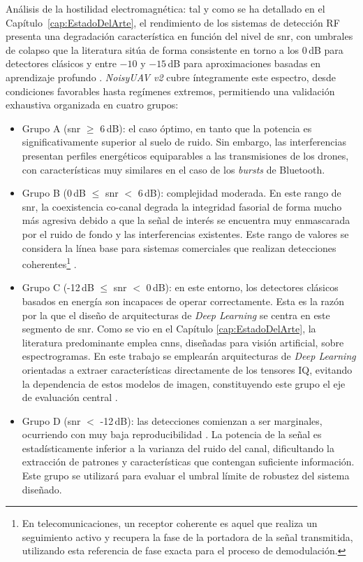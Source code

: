 Análisis de la hostilidad electromagnética: tal y como se ha detallado en el Capítulo~\ref{cap:EstadoDelArte}, el rendimiento de los sistemas de detección RF presenta una degradación característica en función del nivel de \gls{snr}, con umbrales de colapso que la literatura sitúa de forma consistente en torno a los $0$\,dB para detectores clásicos y entre $-10$ y $-15$\,dB para aproximaciones basadas en aprendizaje profundo \cite{zheng_uavsignal_2025, gluge_robust_2024, vasant_ahirrao_rf-based_2024}. \textit{NoisyUAV v2} cubre íntegramente este espectro, desde condiciones favorables hasta regímenes extremos, permitiendo una validación exhaustiva organizada en cuatro grupos:

\begin{itemize}
    \item Grupo A (\gls{snr} $\ge$ 6\,dB): el caso óptimo, en tanto que la potencia es significativamente superior al suelo de ruido. Sin embargo, las interferencias presentan perfiles energéticos equiparables a las transmisiones de los drones, con características muy similares en el caso de los \textit{bursts} de Bluetooth.
    \item Grupo B ($0$\,dB $\le$ \gls{snr} $<$ 6\,dB): complejidad moderada. En este rango de \gls{snr}, la coexistencia co-canal degrada la integridad fasorial de forma mucho más agresiva debido a que la señal de interés se encuentra muy enmascarada por el ruido de fondo y las interferencias existentes. Este rango de valores se considera la línea base para sistemas comerciales que realizan detecciones coherentes\footnote{En telecomunicaciones, un receptor coherente es aquel que realiza un seguimiento activo y recupera la fase de la portadora de la señal transmitida, utilizando esta referencia de fase exacta para el proceso de demodulación.} \cite{vasant_ahirrao_rf-based_2024, martelli_exploitation_2020}.
    \item Grupo C (-12\,dB $\le$ \gls{snr} $<$ 0\,dB): en este entorno, los detectores clásicos basados en energía son incapaces de operar correctamente. Esta es la razón por la que el diseño de arquitecturas de \textit{Deep Learning} se centra en este segmento de \gls{snr}. Como se vio en el Capítulo \ref{cap:EstadoDelArte}, la literatura predominante emplea \glspl{cnn}, diseñadas para visión artificial, sobre espectrogramas. En este trabajo se emplearán arquitecturas de \textit{Deep Learning} orientadas a extraer características directamente de los tensores IQ, evitando la dependencia de estos modelos de imagen, constituyendo este grupo el eje de evaluación central \cite{gluge_robust_2024}.
    \item Grupo D (\gls{snr} $<$ -12\,dB): las detecciones comienzan a ser marginales, ocurriendo con muy baja reproducibilidad \cite{gluge_robust_2024}. La potencia de la señal es estadísticamente inferior a la varianza del ruido del canal, dificultando la extracción de patrones  y características que contengan suficiente información. Este grupo se utilizará para evaluar el umbral límite de robustez del sistema diseñado.
\end{itemize}

